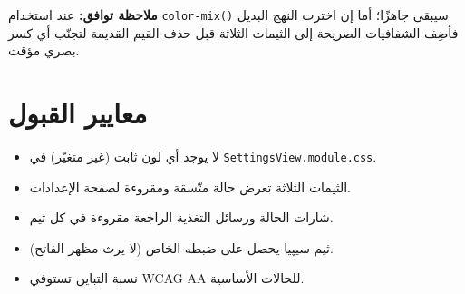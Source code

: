 \documentclass[11pt]{article}
\begin{document}
\begin{warnbox}
\textbf{ملاحظة توافق:} عند استخدام \texttt{color-mix()} سيبقى جاهزًا؛ أما إن اخترت النهج البديل
فأضِف الشفافيات الصريحة إلى الثيمات الثلاثة قبل حذف القيم القديمة لتجنّب أي كسر بصري مؤقت.
\end{warnbox}

\section{معايير القبول}

\begin{itemize}
  \item[${\color{okgreen}\faCheckCircle}$] لا يوجد أي لون ثابت (غير متغيّر) في \texttt{SettingsView.module.css}.
  \item[${\color{okgreen}\faCheckCircle}$] الثيمات الثلاثة تعرض حالة متّسقة ومقروءة لصفحة الإعدادات.
  \item[${\color{okgreen}\faCheckCircle}$] شارات الحالة ورسائل التغذية الراجعة مقروءة في كل ثيم.
  \item[${\color{okgreen}\faCheckCircle}$] ثيم سيپيا يحصل على ضبطه الخاص (لا يرث مظهر الفاتح).
  \item[${\color{okgreen}\faCheckCircle}$] نسبة التباين تستوفي WCAG AA للحالات الأساسية.
\end{itemize}
\end{document}
